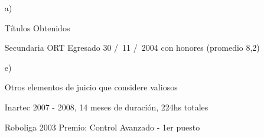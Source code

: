 \begin{enumerate}[leftmargin=0.8cm]

  \item[a)]{Títulos Obtenidos

    \begin{itemize}[leftmargin=0.2cm]

      {Secundaria ORT}
      {Egresado 30 \slash \ 11 \slash \ 2004 con honores (promedio 8,2)}

    \end{itemize}

  }

  \item[e)]{Otros elementos de juicio que considere valiosos

    \begin{itemize}[leftmargin=0.2cm]

      {Inartec}
      {2007 - 2008, 14 meses de duración, 224hs totales}{}

      {Roboliga 2003}
      {Premio: Control Avanzado - 1er puesto}{}

    \end{itemize}

  }

\end{enumerate}
